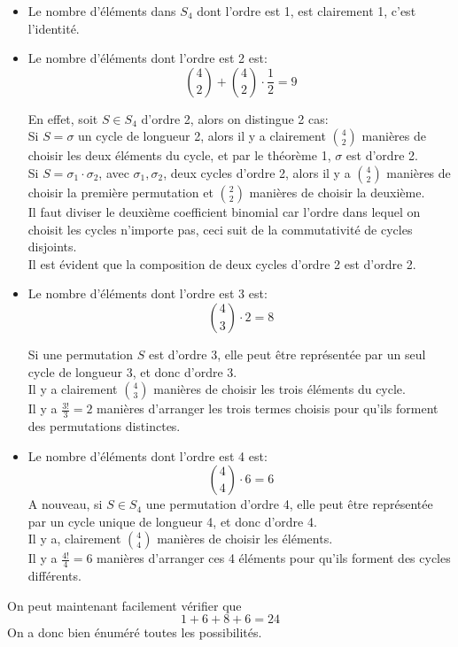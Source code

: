 \documentclass[11pt, a4paper]{article}
\begin{document}
\begin{itemize}
\item Le nombre d'éléments dans $S_4$ dont l'ordre est 1, est clairement 1, c'est l'identité.\\
\item Le nombre d'éléments dont l'ordre est 2 est:
	\[ 
		\binom{4}{2} + \binom{4}{2} \cdot \frac{1}{2} = 9
	\]

En effet, soit $S \in S_4$ d'ordre 2, alors on distingue 2 cas:\\
Si $S = \sigma$ un cycle de longueur 2, alors il y a clairement $\binom{4}{2}$ manières de choisir les deux éléments du cycle, et par le théorème 1, $\sigma$ est d'ordre 2.\\
Si $S= \sigma_1 \cdot \sigma_2$, avec $\sigma_1,\sigma_2$, deux cycles d'ordre 2, alors il y a $\binom{4}{2}$ manières de choisir la première permutation et $\binom{2}{2}$ manières de choisir la deuxième.\\
Il faut diviser le deuxième coefficient binomial car l'ordre dans lequel on choisit les cycles n'importe pas, ceci suit de la commutativité de cycles disjoints.\\
Il est évident que la composition de deux cycles d'ordre 2 est d'ordre 2.
\item Le nombre d'éléments dont l'ordre est 3 est:
	\[ 
		\binom{4}{3} \cdot 2 = 8
	\]

Si une permutation $S$ est d'ordre 3, elle peut être représentée par un seul cycle de longueur 3, et donc d'ordre 3.\\
Il y a clairement $\binom{4}{3}$ manières de choisir les trois éléments du cycle.\\
Il y a $\frac{3!}{3}=2$ manières d'arranger les trois termes choisis pour qu'ils forment des permutations distinctes.

\item Le nombre d'éléments dont l'ordre est 4 est:
	\[ 
		\binom{4}{4} \cdot 6 = 6
	\]
A nouveau, si $S \in S_4$ une permutation d'ordre 4, elle peut être représentée par un cycle unique de longueur 4, et donc d'ordre 4.\\
Il y a, clairement $\binom{4}{4}$ manières de choisir les éléments.\\
Il y a $\frac{4!}{4}=6$ manières d'arranger ces 4 éléments pour qu'ils forment des cycles différents.
\end{itemize}
On peut maintenant facilement vérifier que
\[ 
1 + 6 + 8 + 6 = 24
\]
On a donc bien énuméré toutes les possibilités.
\end{document}
